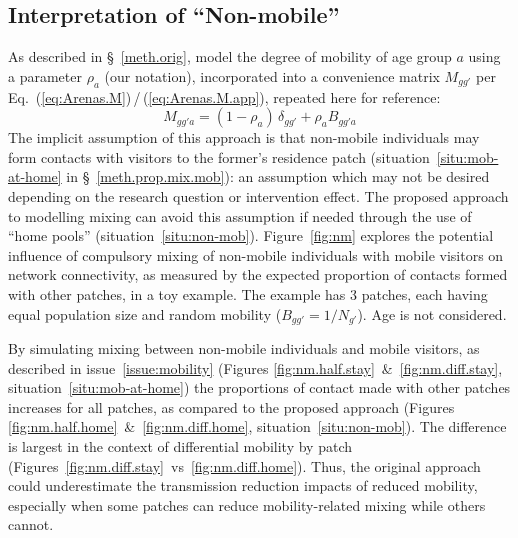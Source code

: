 \subsection{Interpretation of ``Non-mobile''}\label{app.non-mob}
As described in \S~\ref{meth.orig}, \citet{Arenas2020} model the degree of mobility of age group $a$
using a parameter $\rho_a$ (our notation),
incorporated into a convenience matrix $M_{gg'}$ per Eq.~(\ref{eq:Arenas.M})\,/\,(\ref{eq:Arenas.M.app}),
repeated here for reference:
\begin{equation}\label{eq:Arenas.M.app}
  M_{gg'a} = (1-\rho_a)\,\delta_{gg'} + \rho_a B_{gg'a}
\end{equation}
The implicit assumption of this approach is that
non-mobile individuals may form contacts with visitors to the former's residence patch
(situation~\ref{situ:mob-at-home} in \S~\ref{meth.prop.mix.mob}):
an assumption which may not be desired depending on the research question or intervention effect.
The proposed approach to modelling mixing can avoid this assumption if needed
through the use of ``home pools'' (situation~\ref{situ:non-mob}).
Figure~\ref{fig:nm} explores the potential influence of
compulsory mixing of non-mobile individuals with mobile visitors on network connectivity,
as measured by the expected proportion of contacts formed with other patches, in a toy example.
The example has 3 patches, each having equal population size and random mobility ($B_{gg'} = 1/N_{g'}$).
Age is not considered.
\par
By simulating mixing between non-mobile individuals and mobile visitors,
as described in issue~\ref{issue:mobility}
(Figures \ref{fig:nm.half.stay}~\&~\ref{fig:nm.diff.stay}, situation~\ref{situ:mob-at-home})
the proportions of contact made with other patches increases for all patches,
as compared to the proposed approach
(Figures \ref{fig:nm.half.home}~\&~\ref{fig:nm.diff.home}, situation~\ref{situ:non-mob}).
The difference is largest in the context of differential mobility by patch
(Figures~\ref{fig:nm.diff.stay}~vs~\ref{fig:nm.diff.home}).
Thus, the original approach could underestimate
the transmission reduction impacts of reduced mobility,
especially when some patches can reduce mobility-related mixing while others cannot.
